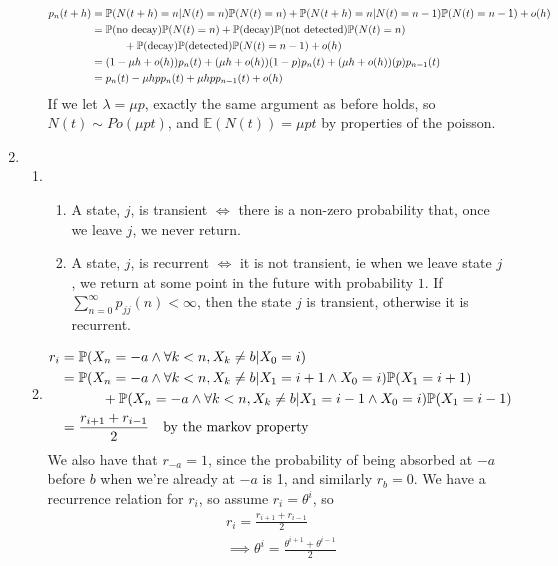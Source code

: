 \documentclass{article}
\begin{document}
\begin{enumerate}
\begin{enumerate}
\begin{align*}
p_n(t+h) &= \mathbb{P}(N(t+h) = n | N(t) = n)\mathbb{P}(N(t)=n) + \mathbb{P}(N(t+h)=n|N(t)=n-1)\mathbb{P}(N(t)=n-1)+o(h)\\
&=\mathbb{P}(\mbox{no decay})\mathbb{P}(N(t)=n) + \mathbb{P}(\mbox{decay})\mathbb{P}(\mbox{not detected})\mathbb{P}(N(t)=n)
 \\ & \quad \quad \quad + \mathbb{P}(\mbox{decay})\mathbb{P}(\mbox{detected})\mathbb{P}(N(t)=n-1)+o(h)\\
&= (1-\mu h + o(h))p_n(t) + (\mu h + o(h))(1-p)p_n(t) + (\mu h+o(h))(p)p_{n-1}(t)\\
&= p_n(t)-\mu h p p_n(t) + \mu h p p_{n-1}(t) +o(h)
\end{align*}
If we let $\lambda = \mu p$, exactly the same argument as before holds, so $N(t) \sim Po(\mu p t)$, and $\mathbb{E}(N(t)) = \mu p t$ by properties of the poisson.

\end{enumerate}
\clearpage
\item 
\begin{enumerate}
\item
\begin{enumerate}
\item
A state, $j$, is transient $\iff$ there is a non-zero probability that, once we leave $j$, we never return.
\item
A state, $j$, is recurrent $\iff$ it is not transient, ie when we leave state $j$, we return at some point in the future with probability $1$. If $\sum\limits_{n=0}^\infty p_{jj}(n) < \infty$, then the state $j$ is transient, otherwise it is recurrent.
\end{enumerate}
\item
\begin{align*}
r_i &= \mathbb{P} (X_n = -a \wedge \forall k<n, X_k \neq b | X_0 = i)\\
&= \mathbb{P} (X_n = -a \wedge \forall k<n, X_k \neq b | X_1 = i+1 \wedge X_0 = i)\mathbb{P} (X_1 = i+1) \\
& \quad \quad \quad + \mathbb{P}(X_n = -a \wedge \forall k<n, X_k \neq b | X_1 = i-1 \wedge X_0 = i)\mathbb{P} (X_1 = i-1)\\
&= \frac{r_{i+1} + r_{i-1}}{2} \quad \mbox{by the markov property}
\end{align*}
We also have that $r_{-a} = 1$, since the probability of being absorbed at $-a$ before $b$ when we're already at $-a$ is 1, and similarly $r_b=0$. We have a recurrence relation for $r_i$, so assume $r_i = \theta^i$, so
\begin{align*}
& r_i = \frac{r_{i+1} + r_{i-1}}{2}\\
&\implies \theta^i = \frac{\theta^{i+1} + \theta^{i-1}}{2}\\

\end{align*}
\end{enumerate}
\end{enumerate}
\end{document}
